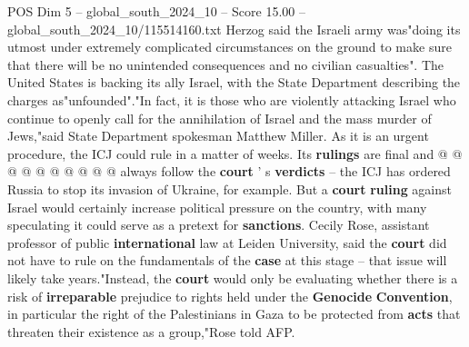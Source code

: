 \begin{textsample}{POS Dim 5 – global\_south\_2024\_10 – Score 15.00 – global\_south\_2024\_10/115514160.txt}
Herzog said the Israeli army was"doing its utmost under extremely complicated circumstances on the ground to make sure that there will be no unintended consequences and no civilian casualties".
The United States is backing its ally Israel, with the State Department describing the charges as"unfounded"."In fact, it is those who are violently attacking Israel who continue to openly call for the annihilation of Israel and the mass murder of Jews,"said State Department spokesman Matthew Miller.
As it is an urgent procedure, the ICJ could rule in a matter of weeks.
Its \textbf{rulings} are final and @ @ @ @ @ @ @ @ @ @ always follow the \textbf{court} ' s \textbf{verdicts} -- the ICJ has ordered Russia to stop its invasion of Ukraine, for example.
But a \textbf{court} \textbf{ruling} against Israel would certainly increase political pressure on the country, with many speculating it could serve as a pretext for \textbf{sanctions}.
Cecily Rose, assistant professor of public \textbf{international} law at Leiden University, said the \textbf{court} did not have to rule on the fundamentals of the \textbf{case} at this stage -- that issue will likely take years."Instead, the \textbf{court} would only be evaluating whether there is a risk of \textbf{irreparable} prejudice to rights held under the \textbf{Genocide} \textbf{Convention}, in particular the right of the Palestinians in Gaza to be protected from \textbf{acts} that threaten their existence as a group,"Rose told AFP.

\end{textsample}
